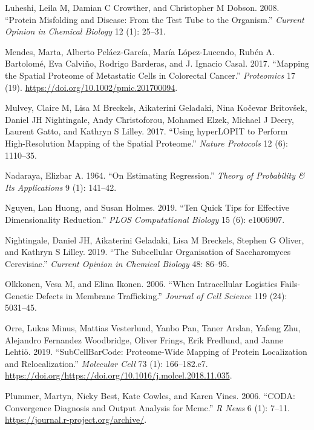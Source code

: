\documentclass[
]{article}
\begin{document}
\leavevmode\hypertarget{ref-Luheshi:2008}{}%
Luheshi, Leila M, Damian C Crowther, and Christopher M Dobson. 2008.
``Protein Misfolding and Disease: From the Test Tube to the Organism.''
\emph{Current Opinion in Chemical Biology} 12 (1): 25--31.

\leavevmode\hypertarget{ref-Mendes:2017}{}%
Mendes, Marta, Alberto Peláez-García, María López-Lucendo, Rubén A.
Bartolomé, Eva Calviño, Rodrigo Barderas, and J. Ignacio Casal. 2017.
``Mapping the Spatial Proteome of Metastatic Cells in Colorectal
Cancer.'' \emph{Proteomics} 17 (19).
\url{https://doi.org/10.1002/pmic.201700094}.

\leavevmode\hypertarget{ref-Mulvey:2017}{}%
Mulvey, Claire M, Lisa M Breckels, Aikaterini Geladaki, Nina Kočevar
Britovšek, Daniel JH Nightingale, Andy Christoforou, Mohamed Elzek,
Michael J Deery, Laurent Gatto, and Kathryn S Lilley. 2017. ``Using
hyperLOPIT to Perform High-Resolution Mapping of the Spatial Proteome.''
\emph{Nature Protocols} 12 (6): 1110--35.

\leavevmode\hypertarget{ref-Nadaraya:1964}{}%
Nadaraya, Elizbar A. 1964. ``On Estimating Regression.'' \emph{Theory of
Probability \& Its Applications} 9 (1): 141--42.

\leavevmode\hypertarget{ref-Nguyen:2019}{}%
Nguyen, Lan Huong, and Susan Holmes. 2019. ``Ten Quick Tips for
Effective Dimensionality Reduction.'' \emph{PLOS Computational Biology}
15 (6): e1006907.

\leavevmode\hypertarget{ref-Nightingale:2019}{}%
Nightingale, Daniel JH, Aikaterini Geladaki, Lisa M Breckels, Stephen G
Oliver, and Kathryn S Lilley. 2019. ``The Subcellular Organisation of
Saccharomyces Cerevisiae.'' \emph{Current Opinion in Chemical Biology}
48: 86--95.

\leavevmode\hypertarget{ref-Olkkonen:2006}{}%
Olkkonen, Vesa M, and Elina Ikonen. 2006. ``When Intracellular Logistics
Fails-Genetic Defects in Membrane Trafficking.'' \emph{Journal of Cell
Science} 119 (24): 5031--45.

\leavevmode\hypertarget{ref-Orre:2019}{}%
Orre, Lukas Minus, Mattias Vesterlund, Yanbo Pan, Taner Arslan, Yafeng
Zhu, Alejandro Fernandez Woodbridge, Oliver Frings, Erik Fredlund, and
Janne Lehtiö. 2019. ``SubCellBarCode: Proteome-Wide Mapping of Protein
Localization and Relocalization.'' \emph{Molecular Cell} 73 (1):
166--182.e7.
\url{https://doi.org/https://doi.org/10.1016/j.molcel.2018.11.035}.

\leavevmode\hypertarget{ref-coda}{}%
Plummer, Martyn, Nicky Best, Kate Cowles, and Karen Vines. 2006. ``CODA:
Convergence Diagnosis and Output Analysis for Mcmc.'' \emph{R News} 6
(1): 7--11. \url{https://journal.r-project.org/archive/}.
\end{document}
